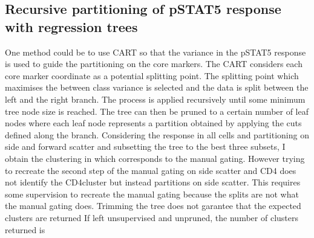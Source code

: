 \subsection{Recursive partitioning of pSTAT5 response with regression trees} 

One method could be to use \gls{CART} so that the variance in the pSTAT5 response is used to guide the partitioning on the core markers.
The \gls{CART} considers each core marker coordinate as a potential splitting point.
The splitting point which maximises the between class variance is selected and the data is split between the left and the right branch.
The process is applied recursively until some minimum tree node size is reached.
The tree can then be pruned to a certain number of leaf nodes where each leaf node represents a partition obtained by applying the cuts
defined along the branch.
Considering the response in all cells and partitioning on side and forward scatter and subsetting the tree to the best three subsets,
I obtain the clustering in  which corresponds to the manual gating.
However trying to recreate the second step of the manual gating on side scatter and CD4 does not identify the CD4\positive cluster
but instead partitions on side scatter.
This requires some supervision to recreate the manual gating because the splits are not what the manual gating does.
Trimming the tree does not garantee that the expected clusters are returned
If left unsupervised and unpruned, the number of clusters returned is 



